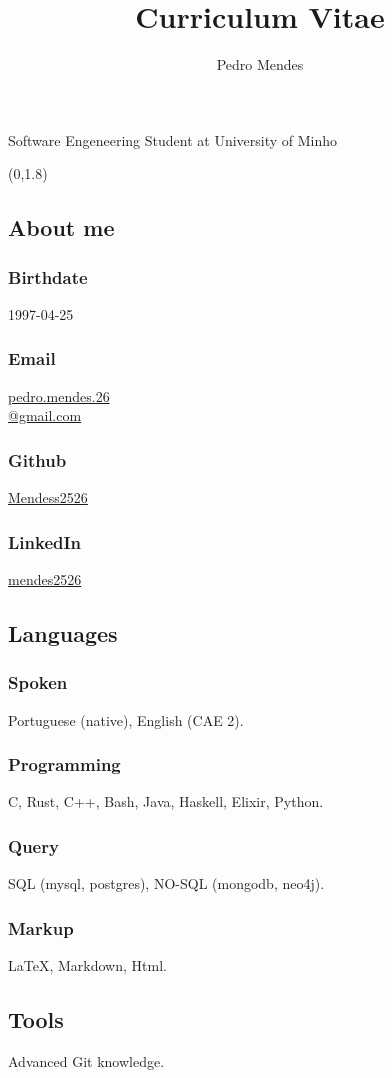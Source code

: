 \documentclass{article}
\renewcommand{\maketitle}{
    \begin{center}
        {\huge\bfseries\theauthor}

        \vspace{.25em}

        \Large{Software Engeneering Student at University of Minho}

        \vspace{.25em}

        \large{\thetitle}
    \end{center}
}
\begin{document}
\title{Curriculum Vitae}
\author{Pedro Mendes}

\maketitle

\begin{textblock}{2}(0,1.8)
    \begin{flushright}
        \subsection{\hfill About me}
        \subsubsection{\hfill Birthdate}
        1997-04-25
        \subsubsection{\hfill Email}
        \href{mailto:pedro.mendes.26@gmail.com}{pedro.mendes.26\\@gmail.com}
        \subsubsection{\hfill Github}
        \href{https://github.com/Mendess2526}{Mendess2526}
        \subsubsection{\hfill LinkedIn}
        \href{https://www.linkedin.com/in/mendes2526/}{mendes2526}

        \subsection{\hfill Languages}
        \subsubsection{\hfill Spoken}
        Portuguese (native), English (CAE 2).
        \subsubsection{\hfill Programming}
        C, Rust, C++, Bash, Java, Haskell, Elixir, Python.
        \subsubsection{\hfill Query}
        SQL (mysql, postgres), NO-SQL (mongodb, neo4j).
        \subsubsection{\hfill Markup}
        \LaTeX, Markdown, Html.
        \subsection{\hfill Tools}
        Advanced Git knowledge.
    \end{flushright}
\end{textblock}
\end{document}
